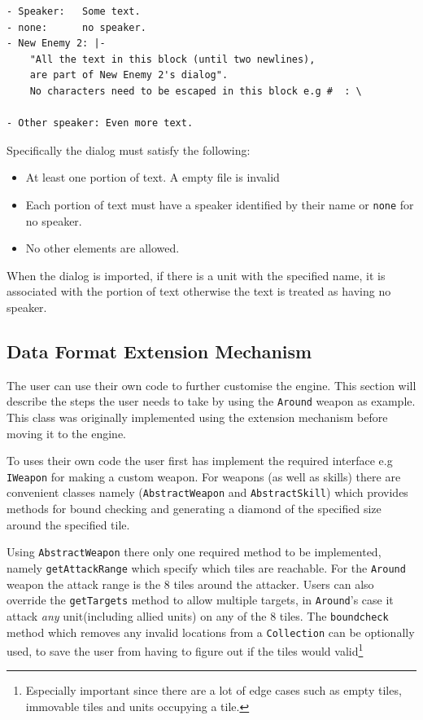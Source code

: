 \begin{lstlisting}[caption=A example show the features of the dialog's data format]
- Speaker:   Some text.
- none:      no speaker.
- New Enemy 2: |-
    "All the text in this block (until two newlines),
    are part of New Enemy 2's dialog". 
    No characters need to be escaped in this block e.g #  : \

- Other speaker: Even more text.
\end{lstlisting}
Specifically the dialog must satisfy the following:
\begin{itemize}
	\item  At least one portion of text. A empty file is invalid
	\item  Each portion of text must have a speaker identified by their name or \texttt{none} for no speaker.
	\item  No other elements are allowed.
\end{itemize}

When the dialog is imported, if there is a unit with  the specified name, it is associated with the  portion of text otherwise the text is treated as having no speaker.


\subsection{Data Format Extension Mechanism}
\label{sub:data_format_extension_mechanism}

The user can use their own code to further customise the engine. This section will describe the steps the user needs to take by using the \texttt{Around} weapon as example. This class was originally implemented using the extension mechanism before moving it to the engine. 

To uses their own code the user first has implement the required interface e.g \texttt{IWeapon} for making a custom weapon.  For weapons (as well as skills) there are convenient classes namely (\texttt{AbstractWeapon} and \texttt{AbstractSkill}) which provides methods for bound checking and generating a diamond of the specified size around the specified tile. 

Using \texttt{AbstractWeapon} there only one required method to be implemented, namely \texttt{getAttackRange} which specify which tiles are reachable. For the \texttt{Around} weapon the attack range is the 8 tiles around the attacker. Users can also override the \texttt{getTargets} method to allow multiple targets, in \texttt{Around}'s case it attack \emph{any} unit(including allied units) on any of the 8 tiles.  The \texttt{boundcheck} method which removes any invalid locations from a \texttt{Collection} can be optionally used, to save the user from having to figure out if the tiles would valid\footnote{Especially important since there are a lot of edge cases such as empty tiles, immovable tiles and units occupying a tile.}

